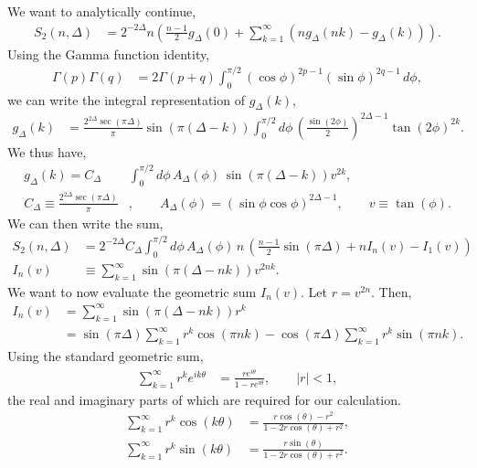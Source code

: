 \documentclass[11pt]{article}
\newcommand{\lb}{\left(}
\newcommand{\rb}{\right)}
\begin{document}
We want to analytically continue,
\begin{align}
    S_2(n,\Delta)&= 2^{-2\Delta}n\lb \frac{n-1}{2}g_\Delta(0) + \sum_{k=1}^\infty \lb ng_\Delta(nk) - g_\Delta(k) \rb\rb.
\end{align}
Using the Gamma function identity,
\begin{align}
    \Gamma(p)\Gamma(q) &= 2\Gamma(p+q) \int_{0}^{\pi/2} (\cos\phi)^{2p-1}(\sin\phi)^{2q-1} \, d\phi,
\end{align}
we can write the integral representation of $g_\Delta (k)$,
\begin{align}
    g_{\Delta}(k) &= \frac{2^{2\Delta}\sec(\pi\Delta)}{\pi} \sin(\pi(\Delta - k)) \int_{0}^{\pi/2} d\phi\, \lb\frac{\sin(2\phi)}{2}\rb^{2\Delta-1}\tan(2\phi)^{2k}.
\end{align}
We thus have,
\begin{align}
    g_\Delta(k) = C_\Delta &\int_0^{\pi/2} d\phi \, A_\Delta(\phi)\, \sin(\pi(\Delta- k))v^{2k}, \\
    C_\Delta \equiv \frac{2^{2\Delta}\sec(\pi\Delta)}{\pi}&, \qquad A_\Delta(\phi) = \lb\sin\phi \cos\phi\rb^{2\Delta -1},\qquad  v \equiv \tan(\phi).
\end{align}
We can then write the sum,
\begin{align}
    S_2(n,\Delta) &= 2^{-2\Delta}C_\Delta \int_0^{\pi/2} d\phi\, A_\Delta(\phi) \, n\, \lb \frac{n-1}{2}\sin(\pi\Delta) + nI_n(v) - I_1(v)  \rb \\
    I_n(v) &\equiv \sum_{k=1}^\infty \sin(\pi(\Delta - nk))v^{2nk}.
\end{align}
We want to now evaluate the geometric sum $I_n(v)$. Let $r = v^{2n}$. Then,
\begin{align}
    I_n(v) &= \sum_{k=1}^\infty \sin(\pi(\Delta - nk))r^{k} \\
    &= \sin(\pi \Delta) \sum_{k=1}^\infty r^k \cos(\pi n k) - \cos(\pi\Delta) \sum_{k=1}^\infty r^k \sin(\pi nk).
\end{align}
Using the standard geometric sum,
\begin{align}
    \sum_{k=1}^\infty r^k e^{ik\theta} &= \frac{re^{i\theta}}{1-re^{i\theta}} , \qquad |r|<1,
\end{align}
the real and imaginary parts of which are required for our calculation.
\begin{align}
    \sum_{k=1}^\infty r^k \cos(k\theta) &= \frac{r\cos(\theta) - r^2}{1-2r\cos(\theta) + r^2}, \\
    \sum_{k=1}^\infty r^k \sin(k\theta) &= \frac{r\sin(\theta)}{1-2r\cos(\theta) +r^2}.
\end{align}
\end{document}
